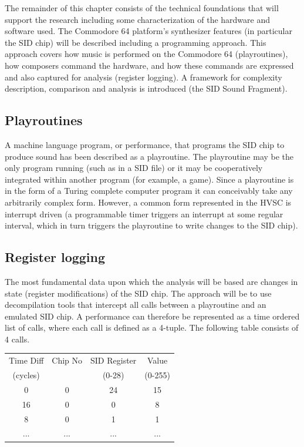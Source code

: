 \documentclass[10pt]{article}
\begin{document}
\begin{multicols*}{2}
The remainder of this chapter consists of the technical foundations that will support the research including some characterization of the hardware and software used. The Commodore 64 platform’s synthesizer features (in particular the SID chip) will be described including a programming approach. This approach covers how music is performed on the Commodore 64 (playroutines), how composers command the hardware, and how these commands are expressed and also captured for analysis (register logging). A framework for complexity description, comparison and analysis is introduced (the SID Sound Fragment).

\subsection{Playroutines}

A machine language program, or performance, that programs the SID chip to produce sound has been described as a playroutine. The playroutine may be the only program running (such as in a SID file) or it may be cooperatively integrated within another program (for example, a game). Since a playroutine is in the form of a Turing complete computer program it can conceivably take any arbitrarily complex form. However, a common form represented in the HVSC is interrupt driven (a programmable timer triggers an interrupt at some regular interval, which in turn triggers the playroutine to write changes to the SID chip).

\subsection{Register logging}

The most fundamental data upon which the analysis will be based are changes in state (register modifications) of the SID chip. The approach will be to use decompilation tools that intercept all calls between a playroutine and an emulated SID chip. A performance can therefore be represented as a time ordered list of calls, where each call is defined as a 4-tuple. The following table consists of 4 calls.

    \begin{tabular}{|c|c|c|c|}
        \hline
        \rule[-1ex]{0pt}{2.5ex} Time Diff & Chip No & SID Register & Value \\
        \rule[-1ex]{0pt}{2.5ex} (cycles) & & (0-28) & (0-255) \\
        \hline
        \rule[-1ex]{0pt}{2.5ex} 0 & 0 & 24 & 15 \\
        \hline
        \rule[-1ex]{0pt}{2.5ex} 16 & 0 & 0 & 8 \\
        \hline
        \rule[-1ex]{0pt}{2.5ex} 8 & 0 & 1 & 1 \\
        \hline
        \rule[-1ex]{0pt}{2.5ex} ... & ... & ... & ... \\
        \hline
    \end{tabular}


\end{multicols*}
\end{document}
